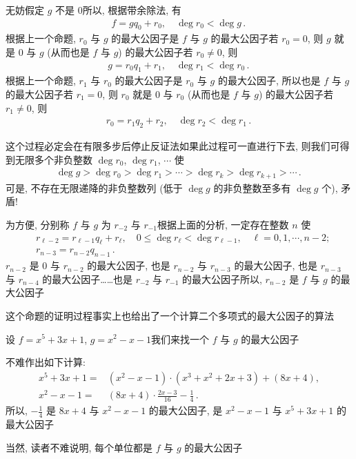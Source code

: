 \begin{pf}
    无妨假定 $g$ 不是 $0$\period 所以, 根据带余除法, 有
    \begin{align*}
        f = gq_0 + r_0, \quad \deg r_0 < \deg g \period
    \end{align*}
    根据上一个命题, $r_0$ 与 $g$ 的最大公因子是 $f$ 与 $g$ 的最大公因子\period 若 $r_0 = 0$, 则 $g$ 就是 $0$ 与 $g$ (从而也是 $f$ 与 $g$) 的最大公因子\period 若 $r_0 \neq 0$, 则
    \begin{align*}
        g = r_0 q_1 + r_1, \quad \deg r_1 < \deg r_0 \period
    \end{align*}
    根据上一个命题, $r_1$ 与 $r_0$ 的最大公因子是 $r_0$ 与 $g$ 的最大公因子, 所以也是 $f$ 与 $g$ 的最大公因子\period 若 $r_1 = 0$, 则 $r_0$ 就是 $0$ 与 $r_0$ (从而也是 $f$ 与 $g$) 的最大公因子\period 若 $r_1 \neq 0$, 则
    \begin{align*}
        r_0 = r_1 q_2 + r_2, \quad \deg r_2 < \deg r_1 \period
    \end{align*}

    这个过程必定会在有限多步后停止\period 反证法\period 如果此过程可一直进行下去, 则我们可得到无限多个非负整数 $\deg r_0$, $\deg r_1$, $\cdots$ 使
    \begin{align*}
        \deg g > \deg r_0 > \deg r_1 > \cdots > \deg r_k > \deg r_{k+1} > \cdots \period
    \end{align*}
    可是, 不存在无限递降的非负整数列 (低于 $\deg g$ 的非负整数至多有 $\deg g$ 个), 矛盾!

    为方便, 分别称 $f$ 与 $g$ 为 $r_{-2}$ 与 $r_{-1}$\period 根据上面的分析, 一定存在整数 $n$ 使
    \begin{align*}
         & r_{\ell - 2} = r_{\ell - 1} q_{\ell} + r_{\ell}, \quad 0 \leq \deg r_{\ell} < \deg r_{\ell - 1}, \quad \ell = 0,1,\cdots,n-2; \\
         & r_{n - 3} = r_{n - 2} q_{n - 1} \period
    \end{align*}
    $r_{n-2}$ 是 $0$ 与 $r_{n-2}$ 的最大公因子, 也是 $r_{n-2}$ 与 $r_{n-3}$ 的最大公因子, 也是 $r_{n-3}$ 与 $r_{n-4}$ 的最大公因子……也是 $r_{-2}$ 与 $r_{-1}$ 的最大公因子\period 所以, $r_{n-2}$ 是 $f$ 与 $g$ 的最大公因子\period
\end{pf}

这个命题的证明过程事实上也给出了一个计算二个多项式的最大公因子的算法\period

\begin{example}
    设 $f = x^5 + 3x + 1$, $g = x^2 - x - 1$\period 我们来找一个 $f$ 与 $g$ 的最大公因子\period

    不难作出如下计算:
    \begin{align*}
        x^5 + 3x + 1 = {} & (x^2 - x - 1) \cdot (x^3 + x^2 + 2x + 3) + (8x + 4),   \\
        x^2 - x - 1  = {} & (8x + 4) \cdot \frac{2x - 3}{16} - \frac{1}{4} \period
    \end{align*}
    所以, $-\frac{1}{4}$ 是 $8x + 4$ 与 $x^2 - x - 1$ 的最大公因子, 是 $x^2 - x - 1$ 与 $x^5 + 3x + 1$ 的最大公因子\period

    当然, 读者不难说明, 每个单位都是 $f$ 与 $g$ 的最大公因子\period
\end{example}

